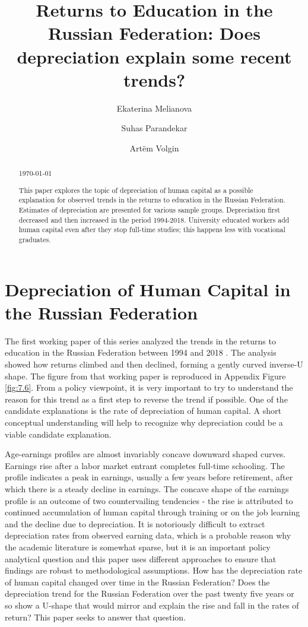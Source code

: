 \documentclass[alpha-refs]{wiley-article-02b}
\title{Returns to Education in the Russian Federation: Does depreciation explain some recent trends?}
\author[*]{Ekaterina Melianova}
\author[*]{\hspace{-1em}Suhas Parandekar}
\author[*]{\hspace{-1em}Art\"{e}m Volgin}
\affil[*]{Education Global Practice, Europe and Central Asia}
\begin{document}
	
\setcounter{page}{1} 

\maketitle

\begin{abstract}
	
\vspace{.5em} \today	
	
This paper explores the topic of depreciation of human capital as a 
possible explanation for observed trends in the returns to education in the 
Russian Federation. Estimates of depreciation are presented for various 
sample groups. Depreciation first decreased and then increased in the 
period 1994-2018. University educated workers add human capital even after 
they stop full-time studies; this happens less with vocational graduates. 
\end{abstract}


\section{Depreciation of Human Capital in the Russian Federation}

The first working paper of this series analyzed the trends in the returns 
to education in the Russian Federation between 1994 and 2018 
\parencite{Patrinos_2020}. The analysis showed how returns climbed and then 
declined, forming a gently curved inverse-U shape. The figure from that 
working paper is reproduced in Appendix Figure \ref{fig:7.6}. From a policy 
viewpoint, it is very important to try to understand the reason for this 
trend as a first step to reverse the trend if possible. One of the 
candidate explanations is the rate of depreciation of human capital. A 
short conceptual understanding will help to recognize why depreciation 
could be a viable candidate explanation. 

Age-earnings profiles are almost invariably concave downward shaped curves. 
Earnings rise after a labor market entrant completes full-time schooling. 
The profile indicates a peak in earnings, usually a few years before 
retirement, after which there is a steady decline in earnings. The concave 
shape of the earnings profile is an outcome of two countervailing 
tendencies - the rise is attributed to continued accumulation of human 
capital through training or on the job learning and the decline due to 
depreciation. It is notoriously difficult to extract depreciation rates 
from observed earning data, which is a probable reason why the academic 
literature is somewhat sparse, but it is an important policy analytical 
question and this paper uses different approaches to ensure that findings 
are robust to methodological assumptions. How has the depreciation rate of 
human capital changed over time in the Russian Federation? Does the 
depreciation trend for the Russian Federation over the past twenty five 
years or so show a U-shape that would mirror and explain the rise and fall 
in the rates of return? This paper seeks to answer that question. 
\end{document}
